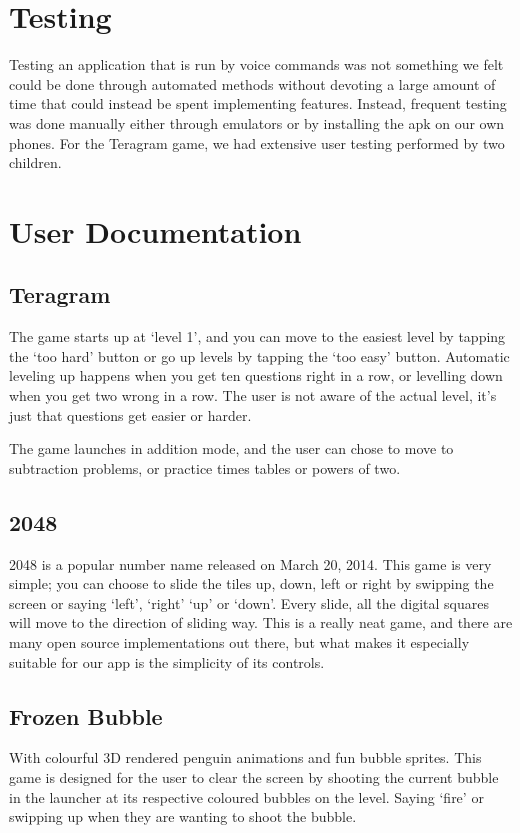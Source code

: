 \documentclass[11pt, oneside]{article}
\begin{document}
\section{Testing}
Testing an application that is run by voice commands was not something
we felt could be done through automated methods without devoting a 
large amount of time that could instead be spent implementing features.
Instead, frequent testing was done manually either through emulators or 
by installing the apk on our own phones. For the Teragram game, we had 
extensive user testing performed by two children.
\pagebreak

\section{User Documentation}

\subsection{Teragram}
The game starts up at `level 1', and you can move to the easiest level
by tapping the `too hard' button or go up levels by tapping the `too
easy' button. Automatic leveling up happens when you get ten
questions right in a row, or levelling down when you get two wrong in
a row. The user is not aware of the actual level, it's just that
questions get easier or harder.

The game launches in addition mode, and the user can chose to move to
subtraction problems, or practice times tables or powers of two.

\subsection{2048}
2048 is a popular number name released on March 20, 2014. This game is
very simple; you can choose to slide the tiles up, down, left or right by
swipping the screen or saying `left', `right' `up' or `down'. Every
slide, all the digital squares will move to the direction of sliding
way. This is a really neat game, and there are many open source
implementations out there, but what makes it especially suitable for
our app is the simplicity of its controls.

\subsection{Frozen Bubble}
With colourful 3D rendered penguin animations and fun bubble sprites. 
This game is designed for the user to clear the screen by shooting the 
current bubble in the launcher at its respective coloured bubbles on 
the level. Saying `fire' or swipping up when they are wanting to shoot
the bubble.  
\end{document}
